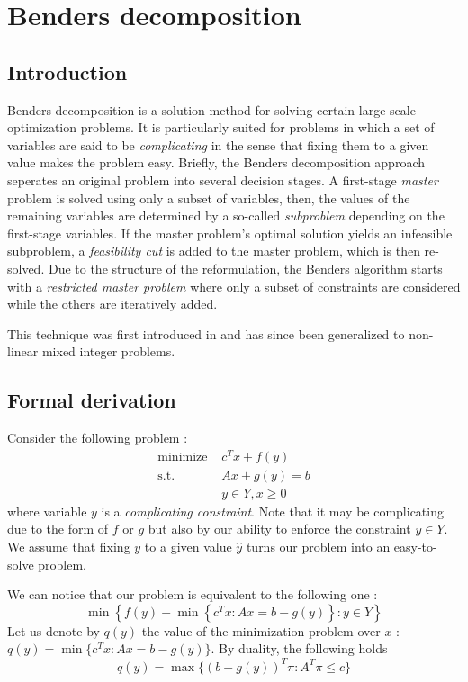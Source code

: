 \chapter{Benders decomposition}

\section{Introduction}

Benders decomposition is a solution method for solving certain large-scale optimization problems. It is particularly suited for problems in which a set of variables are said to be \textit{complicating} in the sense that fixing them to a given value makes the problem easy. Briefly, the Benders decomposition approach seperates an original problem into several decision stages. A first-stage \textit{master} problem is solved using only a subset of variables, then, the values of the remaining variables are determined by a so-called \textit{subproblem} depending on the first-stage variables. If the master problem's optimal solution yields an infeasible subproblem, a \textit{feasibility cut} is added to the master problem, which is then re-solved. Due to the structure of the reformulation, the Benders algorithm starts with a \textit{restricted master problem} where only a subset of constraints are considered while the others are iteratively added. 

This technique was first introduced in \cite{Benders1962} and has since been generalized to non-linear mixed integer problems. 

\section{Formal derivation}

Consider the following problem :
\begin{align}
    \textrm{minimize } & c^Tx + f(y) \\
    \textrm{s.t. } & Ax + g(y) = b \\
    & y\in Y, x\ge 0
\end{align} where variable $y$ is a \textit{complicating constraint}. Note that it may be complicating due to the form of $f$ or $g$ but also by our ability to enforce the constraint $y\in Y$. We assume that fixing $y$ to a given value $\hat y$ turns our problem into an easy-to-solve problem. 

We can notice that our problem is equivalent to the following one : \[
    \min\left\{ f(y) + \min\left\{ c^Tx : Ax = b - g(y) \right\} : y \in Y \right\}
\] Let us denote by $q(y)$ the value of the minimization problem over $x$ : $q(y) = \min\{ c^Tx : Ax = b - g(y) \}$. By duality, the following holds \[
    q(y) = \max\{ (b-g(y))^T\pi : A^T\pi \le c \}
\]
